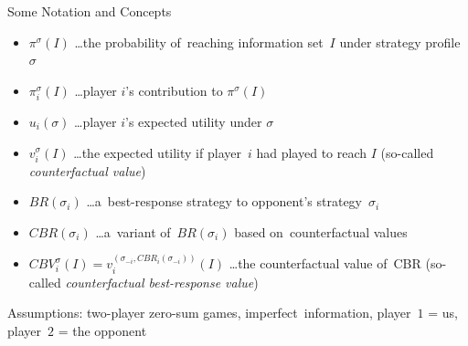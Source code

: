 \documentclass{beamer}
\theoremstyle{definition}
\begin{document}

  \begin{frame}{Some Notation and Concepts}
    \pause
    \begin{itemize}[<+- | alert@+>]
      \item $\pi^{\sigma}(I)$ \ldots the probability of~reaching information set~$I$ under strategy profile~$\sigma$
      \item $\pi_i^{\sigma}(I)$ \ldots player $i$'s contribution to $\pi^{\sigma}(I)$
      \item $u_i(\sigma)$ \ldots player $i$'s expected utility under $\sigma$
      \item $v _i ^{\sigma} (I)$ \ldots the expected utility if player~$i$ had played to reach $I$ (so-called \emph{counterfactual value})
      \item $BR(\sigma_i)$ \ldots a~best-response strategy to opponent's strategy~$\sigma_i$
      \item $CBR(\sigma_i)$ \ldots a~variant of~$BR(\sigma_i)$ based on~counterfactual values
      \item $CBV _i ^\sigma (I) = v _i ^{(\sigma _{-i}, CBR _i (\sigma _{-i} ))} (I)$ \ldots the counterfactual value of~CBR (so-called \emph{counterfactual best-response value})
    \end{itemize}
    \pause

    Assumptions: two-player zero-sum games, imperfect~information, player~$1$ = us, player~$2$ = the opponent
  \end{frame}
\end{document}
